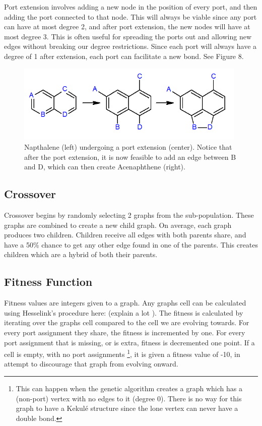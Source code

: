 \documentclass[12pt]{article}
\begin{document}
Port extension involves adding a new node in the position of every port, and then adding the port connected to that node. This will always be viable since any port can have at most degree 2, and after port extension, the new nodes will have at most degree 3. This is often useful for spreading the ports out and allowing new edges without breaking our degree restrictions. Since each port will always have a degree of 1 after extension, each port can facilitate a new bond. See Figure 8.

\begin{figure}[ht!]
\centering
\includegraphics[width=110mm]{portExtension.png}
\caption{Napthalene (left) undergoing a port extension (center). Notice that after the port extension, it is now feasible to add an edge between B and D, which can then create Acenaphthene (right).}
\end{figure}

\subsection{Crossover}

Crossover begins by randomly selecting 2 graphs from the sub-population. These graphs are combined to create a new child graph. On average, each graph produces two children. Children receive all edges with both parents share, and have a 50\% chance to get any other edge found in one of the parents. This creates children which are a hybrid of both their parents.

\subsection{Fitness Function}

Fitness values are integers given to a graph. Any graphs cell can be calculated using Hesselink's procedure here: (explain a lot ). The fitness is calculated by iterating over the graphs cell compared to the cell we are evolving towards. For every port assignment they share, the fitness is incremented by one. For every port assignment that is missing, or is extra, fitness is decremented one point. If a cell is empty, with no port assignments \footnote{This can happen when the genetic algorithm creates a graph which has a (non-port) vertex with no edges to it (degree 0). There is no way for this graph to have a Kekul\'e structure since the lone vertex can never have a double bond.}, it is given a fitness value of -10, in attempt to discourage that graph from evolving onward. 
\end{document}
